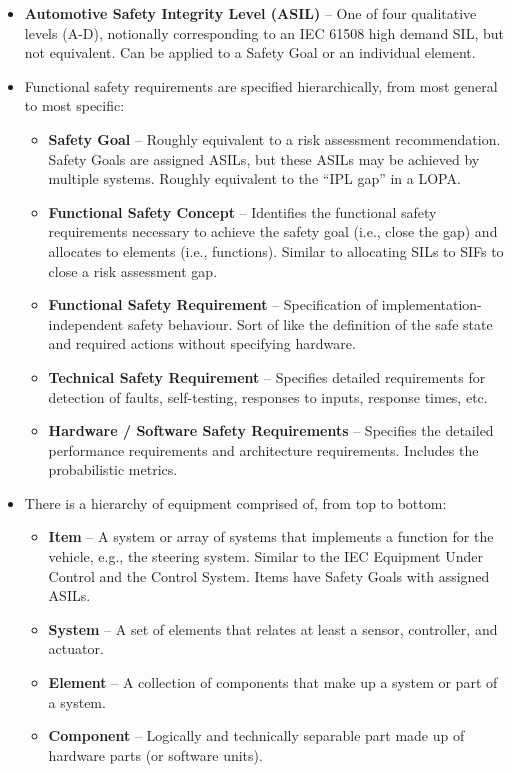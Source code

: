 \documentclass[./dissertation.tex]{subfiles}
\begin{document}
\begin{itemize}
\item \textbf{Automotive Safety Integrity Level (ASIL)} – One of four qualitative levels (A-D), notionally corresponding to an IEC 61508 high demand SIL, but not equivalent. Can be applied to a Safety Goal or an individual element.
\item Functional safety requirements are specified hierarchically, from most general to most specific:
\begin{itemize}
\item \textbf{Safety Goal} – Roughly equivalent to a risk assessment recommendation. Safety Goals are assigned ASILs, but these ASILs may be achieved by multiple systems. Roughly equivalent to the “IPL gap” in a LOPA.
\item \textbf{Functional Safety Concept} – Identifies the functional safety requirements necessary to achieve the safety goal (i.e., close the gap) and allocates to elements (i.e., functions). Similar to allocating SILs to SIFs to close a risk assessment gap.
\item \textbf{Functional Safety Requirement} – Specification of implementation-independent safety behaviour. Sort of like the definition of the safe state and required actions without specifying hardware.
\item \textbf{Technical Safety Requirement} – Specifies detailed requirements for detection of faults, self-testing, responses to inputs, response times, etc.
\item \textbf{Hardware / Software Safety Requirements} – Specifies the detailed performance requirements and architecture requirements. Includes the probabilistic metrics.
\end{itemize}
\item There is a hierarchy of equipment comprised of, from top to bottom:
\begin{itemize}
\item \textbf{Item} – A system or array of systems that implements a function for the vehicle, e.g., the steering system. Similar to the IEC Equipment Under Control and the Control System. Items have Safety Goals with assigned ASILs.
\item \textbf{System} – A set of elements that relates at least a sensor, controller, and actuator.
\item \textbf{Element} – A collection of components that make up a system or part of a system.
\item \textbf{Component} – Logically and technically separable part made up of hardware parts (or software units).

\end{itemize}
\end{itemize}
\end{document}
